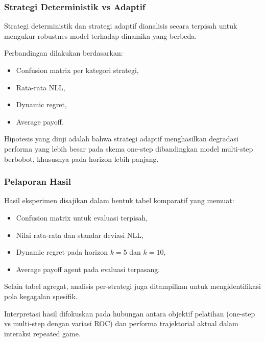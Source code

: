 \subsubsection{Strategi Deterministik vs Adaptif}

Strategi deterministik dan strategi adaptif dianalisis secara terpisah untuk mengukur robustnes model terhadap dinamika yang berbeda.

Perbandingan dilakukan berdasarkan:

\begin{itemize}
    \item Confusion matrix per kategori strategi,
    \item Rata-rata NLL,
    \item Dynamic regret,
    \item Average payoff.
\end{itemize}

Hipotesis yang diuji adalah bahwa strategi adaptif menghasilkan degradasi performa yang lebih besar pada skema one-step dibandingkan model multi-step berbobot, khususnya pada horizon lebih panjang.

\subsubsection{Pelaporan Hasil}

Hasil eksperimen disajikan dalam bentuk tabel komparatif yang memuat:

\begin{itemize}
    \item Confusion matrix untuk evaluasi terpisah,
    \item Nilai rata-rata dan standar deviasi NLL,
    \item Dynamic regret pada horizon $k=5$ dan $k=10$,
    \item Average payoff agent pada evaluasi terpasang.
\end{itemize}

Selain tabel agregat, analisis per-strategi juga ditampilkan untuk mengidentifikasi pola kegagalan spesifik.

Interpretasi hasil difokuskan pada hubungan antara objektif pelatihan (one-step vs multi-step dengan variasi ROC) dan performa trajektorial aktual dalam interaksi repeated game.